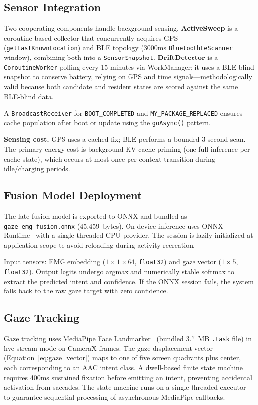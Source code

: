 \documentclass[journal]{IEEEtran}
\begin{document}
\subsection{Sensor Integration}
\label{sec:sensors}

Two cooperating components handle background sensing. \textbf{ActiveSweep} is a coroutine-based collector that concurrently acquires GPS (\texttt{getLastKnownLocation}) and BLE topology (3000ms \texttt{BluetoothLeScanner} window), combining both into a \texttt{SensorSnapshot}. \textbf{DriftDetector} is a \texttt{CoroutineWorker} polling every 15 minutes via WorkManager; it uses a BLE-blind snapshot to conserve battery, relying on GPS and time signals---methodologically valid because both candidate and resident states are scored against the same BLE-blind data.

A \texttt{BroadcastReceiver} for \texttt{BOOT\_COMPLETED} and \texttt{MY\_PACKAGE\_REPLACED} ensures cache population after boot or update using the \texttt{goAsync()} pattern.

\textbf{Sensing cost.} GPS uses a cached fix; BLE performs a bounded 3-second scan. The primary energy cost is background KV cache priming (one full inference per cache state), which occurs at most once per context transition during idle/charging periods.

\subsection{Fusion Model Deployment}
\label{sec:fusion_deploy}

The late fusion model is exported to ONNX and bundled as \texttt{gaze\_emg\_fusion.onnx} (45,459~bytes). On-device inference uses ONNX Runtime~\cite{onnxruntime} with a single-threaded CPU provider. The session is lazily initialized at application scope to avoid reloading during activity recreation.

Input tensors: EMG embedding ($1 \times 1 \times 64$, \texttt{float32}) and gaze vector ($1 \times 5$, \texttt{float32}). Output logits undergo argmax and numerically stable softmax to extract the predicted intent and confidence. If the ONNX session fails, the system falls back to the raw gaze target with zero confidence.

\subsection{Gaze Tracking}
\label{sec:gaze_impl}

Gaze tracking uses MediaPipe Face Landmarker~\cite{mediapipe} (bundled 3.7~MB \texttt{.task} file) in live-stream mode on CameraX frames. The gaze displacement vector (Equation~\ref{eq:gaze_vector}) maps to one of five screen quadrants plus center, each corresponding to an AAC intent class. A dwell-based finite state machine requires 400ms sustained fixation before emitting an intent, preventing accidental activation from saccades. The state machine runs on a single-threaded executor to guarantee sequential processing of asynchronous MediaPipe callbacks.
\end{document}

